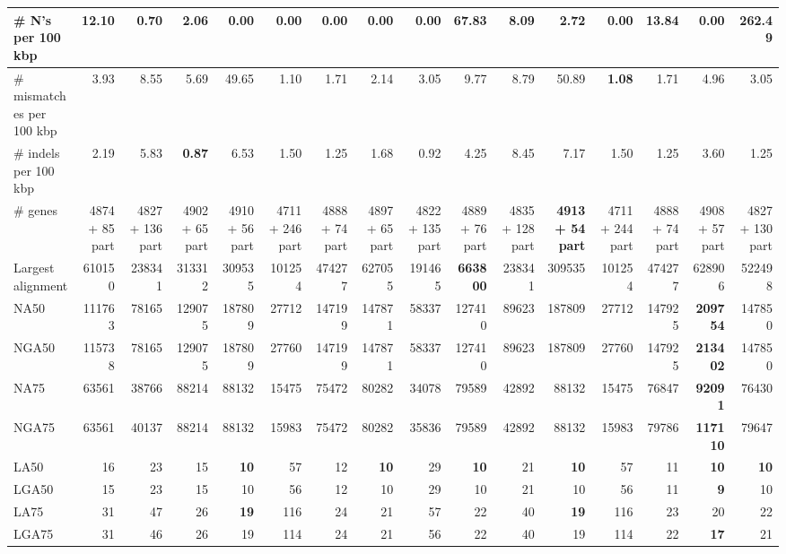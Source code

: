\documentclass[12pt,a4paper]{article}
\begin{document}
\begin{table}[ht]
\begin{center}
\begin{tabular}{|l*{15}{|r}|}
\# N's per 100 kbp & 12.10 & 0.70 & 2.06 & {\bf 0.00} & {\bf 0.00} & {\bf 0.00} & {\bf 0.00} & {\bf 0.00} & 67.83 & 8.09 & 2.72 & {\bf 0.00} & 13.84 & {\bf 0.00} & 262.49 \\ \hline
\# mismatches per 100 kbp & 3.93 & 8.55 & 5.69 & 49.65 & 1.10 & 1.71 & 2.14 & 3.05 & 9.77 & 8.79 & 50.89 & {\bf 1.08} & 1.71 & 4.96 & 3.05 \\ \hline
\# indels per 100 kbp & 2.19 & 5.83 & {\bf 0.87} & 6.53 & 1.50 & 1.25 & 1.68 & 0.92 & 4.25 & 8.45 & 7.17 & 1.50 & 1.25 & 3.60 & 1.25 \\ \hline
\# genes & 4874 + 85 part & 4827 + 136 part & 4902 + 65 part & 4910 + 56 part & 4711 + 246 part & 4888 + 74 part & 4897 + 65 part & 4822 + 135 part & 4889 + 76 part & 4835 + 128 part & {\bf 4913 + 54 part} & 4711 + 244 part & 4888 + 74 part & 4908 + 57 part & 4827 + 130 part \\ \hline
Largest alignment & 610150 & 238341 & 313312 & 309535 & 101254 & 474277 & 627055 & 191465 & {\bf 663800} & 238341 & 309535 & 101254 & 474277 & 628906 & 522498 \\ \hline
NA50 & 111763 & 78165 & 129075 & 187809 & 27712 & 147199 & 147871 & 58337 & 127410 & 89623 & 187809 & 27712 & 147925 & {\bf 209754} & 147850 \\ \hline
NGA50 & 115738 & 78165 & 129075 & 187809 & 27760 & 147199 & 147871 & 58337 & 127410 & 89623 & 187809 & 27760 & 147925 & {\bf 213402} & 147850 \\ \hline
NA75 & 63561 & 38766 & 88214 & 88132 & 15475 & 75472 & 80282 & 34078 & 79589 & 42892 & 88132 & 15475 & 76847 & {\bf 92091} & 76430 \\ \hline
NGA75 & 63561 & 40137 & 88214 & 88132 & 15983 & 75472 & 80282 & 35836 & 79589 & 42892 & 88132 & 15983 & 79786 & {\bf 117110} & 79647 \\ \hline
LA50 & 16 & 23 & 15 & {\bf 10} & 57 & 12 & {\bf 10} & 29 & {\bf 10} & 21 & {\bf 10} & 57 & 11 & {\bf 10} & {\bf 10} \\ \hline
LGA50 & 15 & 23 & 15 & 10 & 56 & 12 & 10 & 29 & 10 & 21 & 10 & 56 & 11 & {\bf 9} & 10 \\ \hline
LA75 & 31 & 47 & 26 & {\bf 19} & 116 & 24 & 21 & 57 & 22 & 40 & {\bf 19} & 116 & 23 & 20 & 22 \\ \hline
LGA75 & 31 & 46 & 26 & 19 & 114 & 24 & 21 & 56 & 22 & 40 & 19 & 114 & 22 & {\bf 17} & 21 \\ \hline
\end{tabular}
\end{center}
\end{table}
\end{document}
